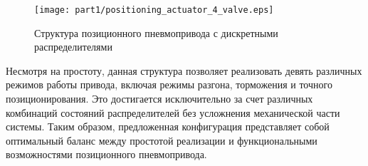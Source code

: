 \begin{figure}[ht]
    \centerfloat
    \texttt{[image: part1/positioning\_actuator\_4\_valve.eps]}
    \caption{Структура позиционного пневмопривода с дискретными распределителями}\label{fig:pp_base_struct}
    \end{figure}


Несмотря на простоту, данная структура позволяет реализовать девять различных режимов
работы привода, включая режимы разгона, торможения и точного позиционирования. Это достигается исключительно за счет
различных комбинаций состояний распределителей без усложнения механической части системы. Таким образом, предложенная
конфигурация представляет собой оптимальный баланс между простотой реализации и функциональными возможностями позиционного пневмопривода.